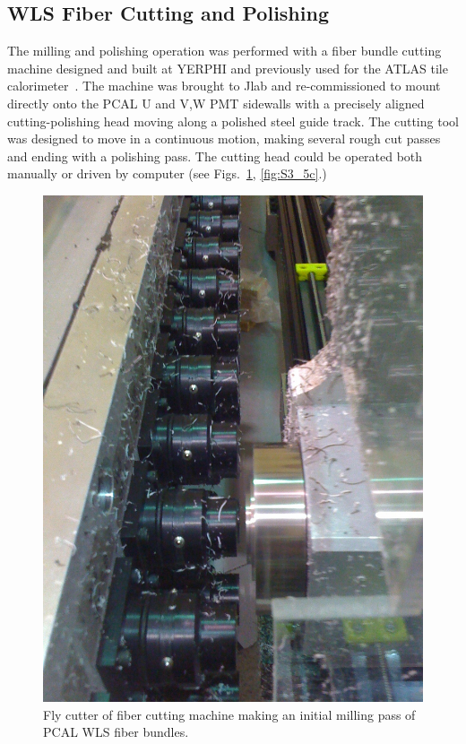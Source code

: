 \subsection{WLS Fiber Cutting and Polishing}

The milling and polishing operation was performed with a fiber bundle cutting machine designed and built at YERPHI and
previously used for the ATLAS tile calorimeter~\cite{ATLAS1997}.  The machine was brought to Jlab and re-commissioned to mount directly onto the PCAL 
U and V,W PMT sidewalls with a precisely aligned cutting-polishing head moving along a polished steel guide track.  The cutting tool was designed to move in a continuous motion, making several rough cut passes and ending with a polishing pass.  The cutting head could be operated both manually or driven by computer (see Figs.~\ref{fig:S3_5d}, \ref{fig:S3_5c}.) 

\begin{figure}[hbt]
\centering
\includegraphics[width=0.95\columnwidth,keepaspectratio]{img/S3_5d.png}
\caption[Cutter 2]{Fly cutter of fiber cutting machine making an initial milling pass of PCAL WLS fiber bundles.}
\label{fig:S3_5d}
\end{figure}

